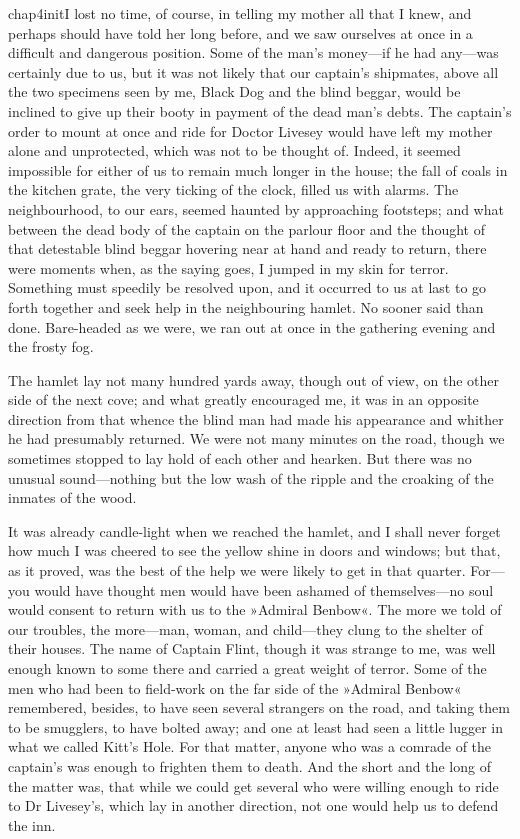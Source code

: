  
   \lettrine[lines=4,image=true]{chap4initI}{} lost no time, of course, in telling my mother all that I knew, and perhaps should have told her long before, and we saw ourselves at once in a difficult and dangerous position. Some of the man's money—if he had any—was certainly due to us, but it was not likely that our captain's shipmates, above all the two specimens seen by me, Black Dog and the blind beggar, would be inclined to give up their booty in payment of the dead man's debts. The captain's order to mount at once and ride for Doctor Livesey would have left my mother alone and unprotected, which was not to be thought of. Indeed, it seemed impossible for either of us to remain much longer in the house; the fall of coals in the kitchen grate, the very ticking of the clock, filled us with alarms. The neighbourhood, to our ears, seemed haunted by approaching footsteps; and what between the dead body of the captain on the parlour floor and the thought of that detestable blind beggar hovering near at hand and ready to return, there were moments when, as the saying goes, I jumped in my skin for terror. Something must speedily be resolved upon, and it occurred to us at last to go forth together and seek help in the neighbouring hamlet. No sooner said than done. Bare-headed as we were, we ran out at once in the gathering evening and the frosty fog.

The hamlet lay not many hundred yards away, though out of view, on the other side of the next cove; and what greatly encouraged me, it was in an opposite direction from that whence the blind man had made his appearance and whither he had presumably returned. We were not many minutes on the road, though we sometimes stopped to lay hold of each other and hearken. But there was no unusual sound—nothing but the low wash of the ripple and the croaking of the inmates of the wood.

It was already candle-light when we reached the hamlet, and I shall never forget how much I was cheered to see the yellow shine in doors and windows; but that, as it proved, was the best of the help we were likely to get in that quarter. For—you would have thought men would have been ashamed of themselves—no soul would consent to return with us to the »Admiral Benbow«. The more we told of our troubles, the more—man, woman, and child—they clung to the shelter of their houses. The name of Captain Flint, though it was strange to me, was well enough known to some there and carried a great weight of terror. Some of the men who had been to field-work on the far side of the »Admiral Benbow« remembered, besides, to have seen several strangers on the road, and taking them to be smugglers, to have bolted away; and one at least had seen a little lugger in what we called Kitt's Hole. For that matter, anyone who was a comrade of the captain's was enough to frighten them to death. And the short and the long of the matter was, that while we could get several who were willing enough to ride to Dr Livesey's, which lay in another direction, not one would help us to defend the inn.

